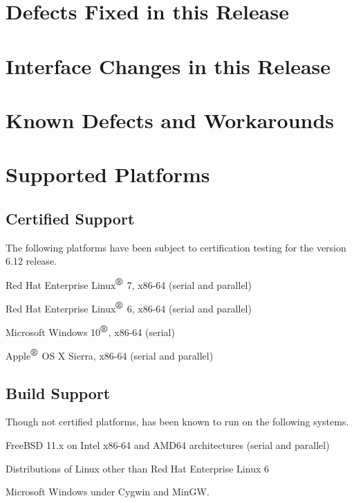 \documentclass[letterpaper]{scrartcl}
\begin{document}
\newpage
\section{Defects Fixed in this Release}



\newpage
\section{Interface Changes in this Release}



\newpage
\section{Known Defects and Workarounds}



\newpage
\section{Supported Platforms}
\subsection*{Certified Support}
The following platforms have been subject to certification testing for the
\Xyce{} version 6.12 release.
\begin{XyceItemize}
  \item Red Hat Enterprise Linux${}^{\mbox{\textregistered}}$ 7, x86-64 (serial and parallel)
  \item Red Hat Enterprise Linux${}^{\mbox{\textregistered}}$ 6, x86-64 (serial and parallel)
  \item Microsoft Windows 10${}^{\mbox{\textregistered}}$, x86-64 (serial)
  \item Apple${}^{\mbox{\textregistered}}$ OS X Sierra, x86-64 (serial and parallel)
\end{XyceItemize}

\subsection*{Build Support}
Though not certified platforms, \Xyce{} has been known to run on the following
systems.
\begin{XyceItemize}
  \item FreeBSD 11.x on Intel x86-64 and AMD64 architectures (serial
    and parallel)
  \item Distributions of Linux other than Red Hat Enterprise Linux 6
  \item Microsoft Windows under Cygwin and MinGW.
\end{XyceItemize}
\end{document}

